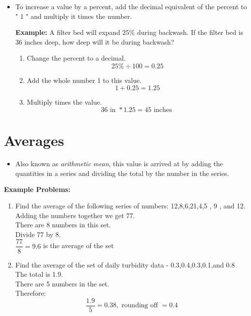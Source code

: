 \begin{itemize}
\item To increase a value by a percent, add the decimal equivalent of the percent to " 1 " and multiply it times the number.

\textbf{Example:} A filter bed will expand $25 \%$ during backwash. If the filter bed is 36 inches deep, how deep will it be during backwash?\\

\begin{enumerate}[Step 1.]
\item Change the percent to a decimal.
$$
25 \% \div 100=0.25
$$
\item Add the whole number 1 to this value.
$$
1+0.25=1.25
$$
\item Multiply times the value.
$$
36 \text { in } * 1.25=45 \text { inches }
$$
\end{enumerate}
\end{itemize}



\section{Averages}
\begin{itemize}
\item Also known as \emph{arithmetic mean}, this value is arrived at by adding the quantities in a series and dividing the total by the number in the series.
\end{itemize}
\textbf{Example Problems:}\\
\begin{enumerate}[1.]
\item Find the average of the following series of numbers: 12,8,6,21,4,5 , 9 , and 12.\\
Adding the numbers together we get 77.\\
There are 8 numbers in this set.\\
Divide 77 by 8.\\

$\dfrac{77}{8}=9.6$ is the average of the set\\

\item Find the average of the set of daily turbidity data - 0.3,0.4,0.3,0.1,and 0.8\\
The total is 1.9.\\
There are 5 numbers in the set.\\
Therefore:
$$
\dfrac{1.9}{5}=0.38, \text { rounding off }=0.4
$$

\end{enumerate}
